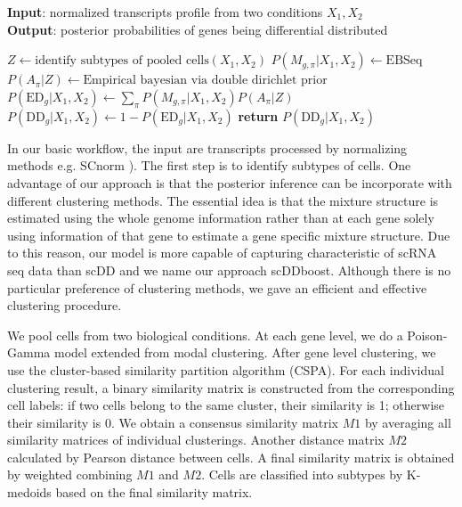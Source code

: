 \documentclass[11pt]{amsart}
\begin{document}
\begin{algorithm}
\caption{}\label{alg:scDDboost}
\raggedright\hspace*{\algorithmicindent} \textbf{Input}: normalized transcripts profile from two conditions $X_1, X_2$ \\
\hspace*{\algorithmicindent} \textbf{Output}: posterior probabilities of genes being differential distributed
\begin{algorithmic}[1]
\State $Z\gets \text{identify subtypes of pooled cells} (X_1,X_2)$
\State $P(M_{g,\pi} | X_1, X_2)\gets \text{EBSeq}$
\State $P(A_\pi | Z)\gets \text{Empirical bayesian via double dirichlet prior}$
\State $P(\text{ED}_g | X_1, X_2)\gets \underset{\pi}{\sum}P(M_{g,\pi} | X_1, X_2)P(A_\pi | Z)$
\State $P(\text{DD}_g | X_1, X_2) \gets 1 - P(\text{ED}_g | X_1, X_2)$
\State \textbf{return} $P(\text{DD}_g | X_1, X_2)$
\EndProcedure
\end{algorithmic}
\end{algorithm}

In our basic workflow, the input are transcripts processed by normalizing methods e.g. SCnorm \cite{ref:Rhonda}). 
The first step is to identify subtypes of cells. One advantage of our approach is that the posterior inference can be incorporate with different clustering methods.
The essential idea is that the mixture structure is estimated using the whole genome information rather than at each gene solely using information of that gene  
to estimate a gene specific mixture structure. Due to this reason, our model is more capable of capturing characteristic of scRNA seq data than scDD and we name our approach scDDboost. Although there is no particular preference of clustering methods, we gave an efficient and effective clustering procedure.

We pool cells from two biological conditions. At each gene level, we do a Poison-Gamma model extended from modal clustering\cite{ref:dahl}. After gene level clustering, we use the cluster-based similarity partition algorithm (CSPA\cite{ref:cspa}). For each individual clustering result, a binary similarity matrix is constructed from the corresponding cell labels: if two cells belong to the same cluster, their similarity is 1; otherwise their similarity is 0. We obtain a consensus similarity matrix $M1$ by averaging all similarity matrices of individual clusterings. Another distance matrix $M2$ calculated by Pearson distance between cells. A final similarity matrix is obtained by weighted combining $M1$ and $M2$. Cells are classified into subtypes by K-medoids based on the final similarity matrix. 
\end{document}
